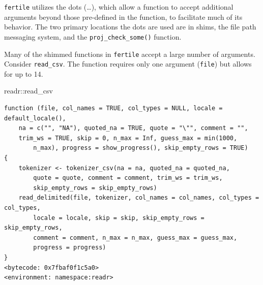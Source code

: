 \documentclass[12pt,twoside]{reedthesis}
\newenvironment{Shaded}{\begin{snugshade}}{\end{snugshade}}
\newcommand{\NormalTok}[1]{#1}
\newcommand{\SpecialCharTok}[1]{\textcolor[rgb]{0.00,0.00,0.00}{#1}}
\begin{document}
\texttt{fertile} utilizes the dots (\ldots), which allow a function to accept additional arguments beyond those pre-defined in the function, to facilitate much of its behavior. The two primary locations the dots are used are in shims, the file path messaging system, and the \texttt{proj\_check\_some()} function.

Many of the shimmed functions in \texttt{fertile} accept a large number of arguments. Consider \texttt{read\_csv}. The function requires only one argument (\texttt{file}) but allows for up to 14.
\begin{Shaded}
\begin{Highlighting}[]
\NormalTok{readr}\SpecialCharTok{::}\NormalTok{read\_csv}
\end{Highlighting}
\end{Shaded}
\small
\begin{verbatim}
function (file, col_names = TRUE, col_types = NULL, locale = default_locale(), 
    na = c("", "NA"), quoted_na = TRUE, quote = "\"", comment = "", 
    trim_ws = TRUE, skip = 0, n_max = Inf, guess_max = min(1000, 
        n_max), progress = show_progress(), skip_empty_rows = TRUE) 
{
    tokenizer <- tokenizer_csv(na = na, quoted_na = quoted_na, 
        quote = quote, comment = comment, trim_ws = trim_ws, 
        skip_empty_rows = skip_empty_rows)
    read_delimited(file, tokenizer, col_names = col_names, col_types = col_types, 
        locale = locale, skip = skip, skip_empty_rows = skip_empty_rows, 
        comment = comment, n_max = n_max, guess_max = guess_max, 
        progress = progress)
}
<bytecode: 0x7fbaf0f1c5a0>
<environment: namespace:readr>
\end{verbatim}
\normalsize
\end{document}
